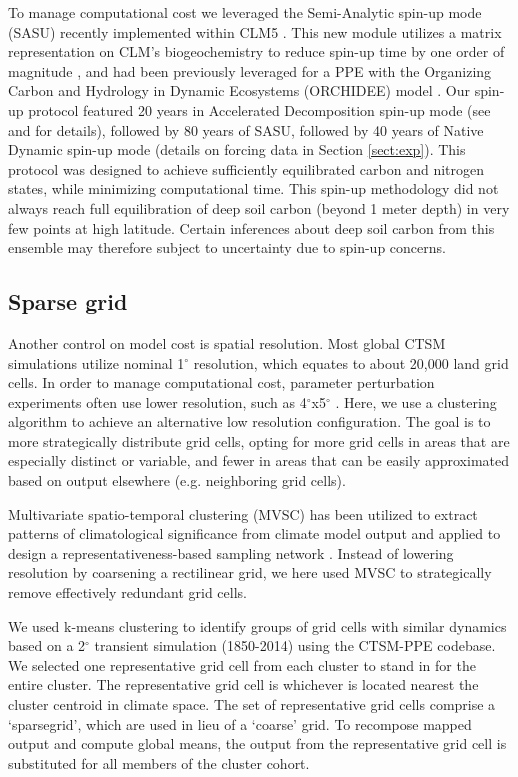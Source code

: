 \documentclass[draft]{agujournal2019}
\begin{document}
To manage computational cost we leveraged the Semi-Analytic spin-up mode (SASU) recently implemented within CLM5 \cite{lu2020,liao2023}. This new module utilizes a matrix representation on CLM's biogeochemistry to reduce spin-up time by one order of magnitude \cite{luo2022,liao2023}, and had been previously leveraged for a PPE with the Organizing Carbon and Hydrology in Dynamic Ecosystems (ORCHIDEE) model \cite{huang2018}. Our spin-up protocol featured 20 years in Accelerated Decomposition spin-up mode (see  and  for details), followed by 80 years of SASU, followed by 40 years of Native Dynamic spin-up mode (details on forcing data in Section \ref{sect:exp}). This protocol was designed to achieve sufficiently equilibrated carbon and nitrogen states, while minimizing computational time. This spin-up methodology did not always reach full equilibration of deep soil carbon (beyond 1 meter depth) in very few points at high latitude. Certain inferences about deep soil carbon from this ensemble may therefore subject to uncertainty due to spin-up concerns.

\subsection{Sparse grid}
\label{sect:sg}
Another control on model cost is spatial resolution. Most global CTSM simulations utilize nominal 1$^\circ$ resolution, which equates to about 20,000 land grid cells. In order to manage computational cost, parameter perturbation experiments often use lower resolution, such as 4$^\circ$x5$^\circ$ \cite{dagon2020}. Here, we use a clustering algorithm to achieve an alternative low resolution configuration. The goal is to more strategically distribute grid cells, opting for more grid cells in areas that are especially distinct or variable, and fewer in areas that can be easily approximated based on output elsewhere (e.g. neighboring grid cells). 

Multivariate spatio-temporal clustering (MVSC) has been utilized to extract patterns of climatological significance from climate model output \cite{hoffman2005} and applied to design a representativeness-based sampling network \cite{hoffman2013}. Instead of lowering resolution by coarsening a rectilinear grid, we here used MVSC to strategically remove effectively redundant grid cells.

We used k-means clustering to identify groups of grid cells with similar dynamics based on a 2$^\circ$ transient simulation (1850-2014) using the CTSM-PPE codebase. We selected one representative grid cell from each cluster to stand in for the entire cluster. The representative grid cell is whichever is located nearest the cluster centroid in climate space. The set of representative grid cells comprise a `sparsegrid', which are used in lieu of a `coarse' grid. To recompose mapped output and compute global means, the output from the representative grid cell is substituted for all members of the cluster cohort.
\end{document}
